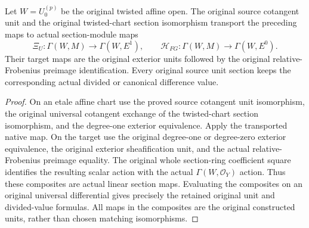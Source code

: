 \begin{definition}
\label{def:actual-witt-geometric-xi-homotopy-sections}
\leanok
Let $W=U_0^{(p)}$ be the original twisted affine open. The original source cotangent unit and the original twisted-chart section isomorphism transport the preceding maps to actual section-module maps
\[
 \Xi_U:\Gamma(W,M)\longrightarrow\Gamma(W,E^1),\qquad
 \mathcal H_{FG}:\Gamma(W,M)\longrightarrow\Gamma(W,E^0).
\]
Their target maps are the original exterior units followed by the original relative-Frobenius preimage identification. Every original source unit section keeps the corresponding actual divided or canonical difference value.
\end{definition}
\begin{proof}
On an etale affine chart use the proved source cotangent unit isomorphism, the original universal cotangent exchange of the twisted-chart section isomorphism, and the degree-one exterior equivalence. Apply the transported native map. On the target use the original degree-one or degree-zero exterior equivalence, the original exterior sheafification unit, and the actual relative-Frobenius preimage equality. The original whole section-ring coefficient square identifies the resulting scalar action with the actual $\Gamma(W,\mathcal O_Y)$ action. Thus these composites are actual linear section maps. Evaluating the composites on an original universal differential gives precisely the retained original unit and divided-value formulas. All maps in the composites are the original constructed units, rather than chosen matching isomorphisms.
\end{proof}

